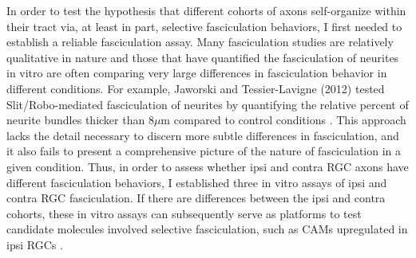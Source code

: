 In order to test the hypothesis that different cohorts of axons self-organize within their tract via, at least in part, selective fasciculation behaviors, I first needed to establish a reliable fasciculation assay.
Many fasciculation studies are relatively qualitative in nature and those that have quantified the fasciculation of neurites in vitro are often comparing very large differences in fasciculation behavior in different conditions.
For example, Jaworski and Tessier-Lavigne (2012) tested Slit/Robo-mediated fasciculation of neurites by quantifying the relative percent of neurite bundles thicker than 8$\mu$m compared to control conditions \cite{jaworski2012autocrine}.
This approach lacks the detail necessary to discern more subtle differences in fasciculation, and it also fails to present a comprehensive picture of the nature of fasciculation in a given condition. 
Thus, in order to assess whether ipsi and contra RGC axons have different fasciculation behaviors, I established three in vitro assays of ipsi and contra RGC fasciculation.
If there are differences between the ipsi and contra cohorts, these in vitro assays can subsequently serve as platforms to test candidate molecules involved selective fasciculation, such as CAMs upregulated in ipsi RGCs \cite{wang2016ipsilateral}.